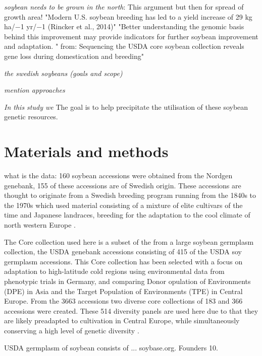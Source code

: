 \documentclass[9pt, onecolumn,twoside]{gsajnl}
\begin{document}
\textit{soybean needs to be grown in the north}:  This argument but then for spread of growth area! "Modern U.S. soybean breeding has led to a yield increase of 29 kg ha/−1 yr/−1 (Rincker et al., 2014)" 
 "Better understanding the genomic basis behind this improvement may provide indicators for further soybean improvement and adaptation. "  from: Sequencing the USDA core soybean collection reveals gene loss during domestication and breeding"

\textit{the swedish soybeans (goals and scope)}

\textit{mention approaches}

\textit{In this study we}
The goal is to help precipitate the utilisation of these soybean genetic resources. 

\section{Materials and methods}
\label{sec:materials:methods}

what is the data: 160 soybean accessions were obtained from the Nordgen genebank, 155 of these accessions are of Swedish origin. These accessions are thought to originate from a Swedish breeding program running from the 1840s to the 1970s which used material consisting of a mixture of elite cultivars of the time and Japanese landraces, breeding for the adaptation to the cool climate of north western Europe \cite{holmberg1973}. 
 
The Core collection used here is a subset of the from a large soybean germplasm collection, the  USDA genebank accessions consisting of 415 of the USDA soy germplasm accessions. This Core collection has been selected with a focus on adaptation to high-latitude cold regions using environmental data from phenotypic trials in Germany, and comparing Donor opulation of Environments (DPE) in Asia and the Target Population of Environments (TPE) in Central Europe. From the 3663 accessions two diverse core collections of 183 and 366 accessions were created. These 514 diversity panels are used here due to that they are likely preadapted to cultivation in Central Europe, while simultaneously conserving a high level of genetic diversity .  

USDA germplasm of soybean consists of ... soybase.org.  Founders 10. 
\end{document}
